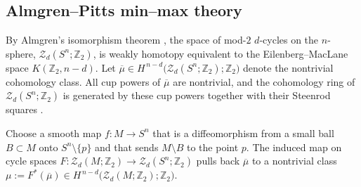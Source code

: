 \documentclass[12pt,english]{article}
\theoremstyle{definition}
\newtheorem{remark}[theorem]{Remark}
\begin{document}

\subsection{Almgren--Pitts min--max theory}

By Almgren's isomorphism theorem \cite{A1,A2,GuL}, the space of mod-\(2\) \(d\)-cycles on the \(n\)-sphere,
\(\mathcal{Z}_d(S^n;\mathbb{Z}_2)\), is weakly homotopy equivalent to the Eilenberg--MacLane space \(K(\mathbb{Z}_2,n-d)\).
Let \(\overline\mu\in H^{\,n-d}\big(\mathcal{Z}_d(S^n;\mathbb{Z}_2);\mathbb{Z}_2\big)\) denote the nontrivial cohomology class.
All cup powers of \(\overline\mu\) are nontrivial, and the cohomology ring of \(\mathcal{Z}_d(S^n;\mathbb{Z}_2)\)
is generated by these cup powers together with their Steenrod squares \cite{Ha}.

Choose a smooth map \(f\colon M\to S^n\) that is a diffeomorphism from a small ball \(B\subset M\)
onto \(S^n\setminus\{p\}\) and that sends \(M\setminus B\) to the point \(p\). The induced map on cycle spaces
\(F\colon\mathcal{Z}_d(M;\mathbb{Z}_2)\to\mathcal{Z}_d(S^n;\mathbb{Z}_2)\) pulls back \(\overline\mu\) to a nontrivial class
\(\mu:=F^*(\overline\mu)\in H^{\,n-d}\big(\mathcal{Z}_d(M;\mathbb{Z}_2);\mathbb{Z}_2\big)\).
\end{document}
